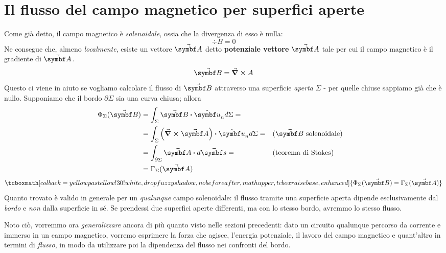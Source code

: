 \section{Il flusso del campo magnetico per superfici aperte}
Come già detto, il campo magnetico è \textit{solenoidale}, ossia che la divergenza di esso è nulla:
\begin{equation*}
	\div{B}=0
\end{equation*}
Ne consegue che, almeno \textit{localmente}, esiste un vettore $\vba{A}$ detto \textbf{potenziale vettore} $\vba{A}$ tale per cui il campo magnetico è il gradiente di $\vba{A}$.
\begin{equation}
	\vba{B}=\curl{A}
\end{equation}
Questo ci viene in aiuto se vogliamo calcolare il flusso di $\vba{B}$ attraverso una superficie \textit{aperta} $\Sigma$ - per quelle chiuse sappiamo già che è nullo. Supponiamo che il bordo $\partial \Sigma$ sia una curva chiusa; allora
\begin{align*}
	\Phi_{\Sigma}(\vba{B})&=\int_{\Sigma}\vba{B}\vdot\vbh{u}_nd\Sigma=\\
	&=\int_{\Sigma}\left(\curl{\vba{A}}\right)\vdot\vbh{u}_nd\Sigma=&&\text{(}\vba{B}\ \text{solenoidale)}\\
	&=\int_{\partial \Sigma}\vba{A}\vdot d\vba{s}=&&\text{(teorema di Stokes)}\\
	&=\Gamma_{\Sigma}(\vba{A})&&
\end{align*}
\begin{equation}
	\tcboxmath[colback=yellowpastellow!30!white,drop fuzzy shadow, nobeforeafter, math upper, tcbox raise base, enhanced]{\Phi_{\Sigma}(\vba{B})=\Gamma_{\Sigma}(\vba{A})}
\end{equation}
Quanto trovato è valido in generale per un \textit{qualunque} campo solenoidale: il flusso tramite una superficie aperta dipende esclusivamente dal \textit{bordo} e \textit{non} dalla superficie in sé. Se prendessi due superfici aperte differenti, ma con lo stesso bordo, avremmo lo stesso flusso.

Noto ciò, vorremmo ora \textit{generalizzare} ancora di più quanto visto nelle sezioni precedenti: dato un circuito qualunque percorso da corrente e immerso in un campo magnetico, vorremo esprimere la forza che agisce, l'energia potenziale, il lavoro del campo magnetico e quant'altro in termini di \textit{flusso}, in modo da utilizzare poi la dipendenza del flusso nei confronti del bordo.


